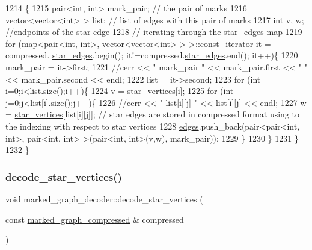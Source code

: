 \begin{DoxyCode}
1214 \{
1215   pair<int, int> mark\_pair; \textcolor{comment}{// the pair of marks}
1216   vector<vector<int> > list; \textcolor{comment}{// list of edges with this pair of marks}
1217   \textcolor{keywordtype}{int} v, w; \textcolor{comment}{//endpoints of the star edge}
1218   \textcolor{comment}{// iterating through the star\_edges map}
1219   \textcolor{keywordflow}{for} (map<pair<int, int>, vector<vector<int> > >::const\_iterator it = compressed.
      \hyperlink{classmarked__graph__compressed_a7df5779d313486644132bd816937f532}{star\_edges}.begin(); it!=compressed.\hyperlink{classmarked__graph__compressed_a7df5779d313486644132bd816937f532}{star\_edges}.end(); it++)\{
1220     mark\_pair = it->first;
1221     \textcolor{comment}{//cerr << " mark\_pair " << mark\_pair.first << " " << mark\_pair.second << endl;}
1222     list = it->second;
1223     \textcolor{keywordflow}{for} (\textcolor{keywordtype}{int} i=0;i<list.size();i++)\{
1224       v = \hyperlink{classmarked__graph__decoder_a06fc05827db14b675f7ecc2fd915b533}{star\_vertices}[i];
1225       \textcolor{keywordflow}{for} (\textcolor{keywordtype}{int} j=0;j<list[i].size();j++)\{
1226         \textcolor{comment}{//cerr << " list[i][j] " << list[i][j] << endl;}
1227         w = \hyperlink{classmarked__graph__decoder_a06fc05827db14b675f7ecc2fd915b533}{star\_vertices}[list[i][j]]; \textcolor{comment}{// star edges are stored in compressed format using to
       the indexing with respect to star vertices}
1228         \hyperlink{classmarked__graph__decoder_af9e75da0a495d9c3bdcd169e15e3261e}{edges}.push\_back(pair<pair<int, int>, pair<int, int> >(pair<int, int>(v,w), mark\_pair));
1229       \}
1230     \}
1231   \}
1232 \}
\end{DoxyCode}
\mbox{\label{classmarked__graph__decoder_a57fba34d119743414a38c7339b910d99}} 
\subsubsection{\texorpdfstring{decode\+\_\+star\+\_\+vertices()}{decode\_star\_vertices()}}
{\footnotesize\ttfamily void marked\+\_\+graph\+\_\+decoder\+::decode\+\_\+star\+\_\+vertices (\begin{DoxyParamCaption}\item[{const \hyperlink{classmarked__graph__compressed}{marked\+\_\+graph\+\_\+compressed} \&}]{compressed }\end{DoxyParamCaption})\hspace{0.3cm}{\ttfamily [private]}}


